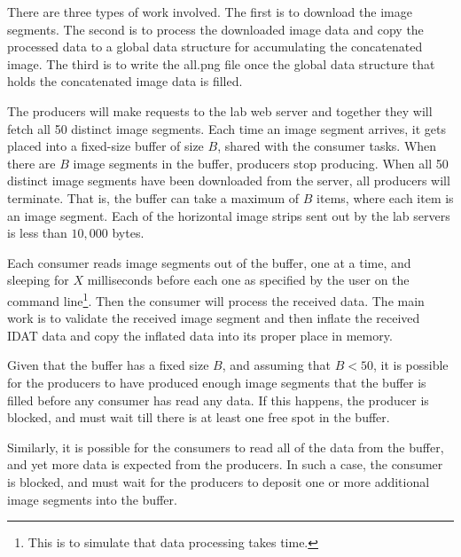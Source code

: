 There are three types of work involved. The first  is to download the image segments. The second is to process the downloaded image data and copy the processed data to a global data structure for accumulating the concatenated image. The third is to write the all.png file once the global data structure that holds the concatenated image data is filled.

The producers will make requests to the lab web server and together they will fetch all 50 distinct image segments. Each time an image segment arrives, it gets placed into a fixed-size buffer of size $B$, 
shared with the consumer tasks. When there are $B$ image segments in the buffer, producers stop producing. When all 50 distinct image segments have been downloaded from the server, all producers will terminate. That is, the buffer can take a maximum of $B$ items, where each item is an image segment. Each of the horizontal image strips sent out by the lab servers is less than $10,000$ bytes. 

Each consumer reads image segments out of the buffer, one at a time, and sleeping for $X$ milliseconds before each one as specified by the user on the command line\footnote{This is to simulate that data processing takes time.}. Then the consumer will process the received data. The main work is to validate the received image segment and then inflate the received IDAT data and copy the inflated data into its proper place in memory. 

Given that the buffer has a fixed size $B$, and assuming that $B < 50$, it is possible for the producers to have produced enough image segments that the buffer is filled before any consumer has read any data.  If this happens, the producer is blocked, and must wait till there is at least one free spot in the buffer.  

Similarly, it is possible for the consumers to read all of the data from the buffer, and yet more data is expected from the producers.  In such a case, the consumer is blocked, and must wait for the producers to deposit one or more additional image segments into the buffer.  

